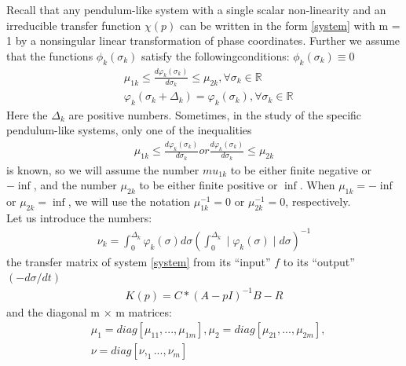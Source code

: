 \documentclass[a4paper,14pt]{extarticle} %
\begin{document}
Recall that any pendulum-like system with a single scalar non-linearity and an irreducible transfer function $\chi(p)$ can be written in the form \eqref{system} with m = 1 by a nonsingular linear transformation of phase coordinates. Further we assume that the functions $\phi_k(\sigma_k)$ satisfy the followingconditions: $\phi_k(\sigma_k) \equiv 0$\\
 \begin{equation}
 \begin{aligned}
&\mu_{1k} \leq \frac{d\varphi_k(\sigma_k)}{d\sigma_k} \leq \mu_{2k}, \forall \sigma_k \in \mathbb{R}\\
&\varphi_k(\sigma_k+\Delta_k) = \varphi_k(\sigma_k), \forall \sigma_k \in \mathbb{R}
 \end{aligned}
\end{equation}
Here the $\Delta_k$ are positive numbers. Sometimes, in the study of the specific pendulum-like systems, only one of the inequalities
 \begin{equation}
 \begin{aligned}
\mu_{1k} \leq \frac{d\varphi_k(\sigma_k)}{d\sigma_k}  or \frac{d\varphi_k(\sigma_k)}{d\sigma_k} \leq \mu_{2k}
 \end{aligned}
\end{equation}
is known, so we will assume the number $mu_{1k}$ to be either finite negative or $-\inf$, and the number $\mu_{2k}$ to be either finite positive or $\inf$.
When $\mu_{1k} = -\inf$ or $\mu_{2k} = \inf$, we will use the notation $\mu_{1k}^{-1} = 0$ or $\mu_{2k}^{-1} = 0$, respectively.\\

Let us introduce the numbers:
 \begin{equation}
 \begin{aligned}
\nu_k = \int_{0}^{\Delta_k} \varphi_k(\sigma) d\sigma (\int_{0}^{\Delta_k} \mid \varphi_k(\sigma) \mid d\sigma)^{-1}
 \end{aligned}
\end{equation}
the transfer matrix of system \eqref{system} from its “input” $f$ to its “output” $(-d\sigma/dt)$
 \begin{equation}
 \begin{aligned}
K(p) = C*(A - pI)^{-1}B - R
\end{aligned}
\end{equation}
and the diagonal m × m matrices:
 \begin{equation}
 \begin{aligned}
&\mu_1 = diag [\mu_{11}, . . . , \mu_{1m}],    \mu_2 = diag [\mu_{21}, . . . , \mu_{2m}],\\
&\nu = diag [\nu, _1. . . , \nu_m]
\end{aligned}
\end{equation}
\end{document}
